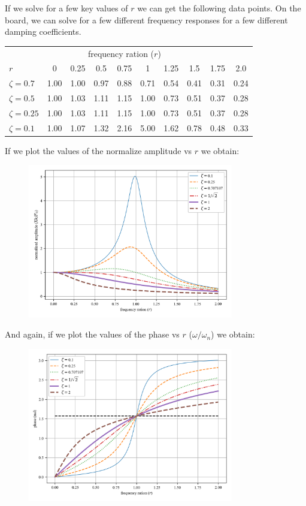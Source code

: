 \documentclass[12pt,letter]{article}
\numberwithin{ex}{section} %
\numberwithin{re}{section} %
\begin{document}
			If we solve for a few key values of $r$ we can get the following data points. On the board, we can solve for a few different frequency responses for a few different damping coefficients. 
			\begin{table}[H]
				\centering
				\begin{tabular}{@{}lccccccccc@{}}
				\toprule
				 & & \multicolumn{5}{c}{frequency ration ($r$)} \\ 
				$r$ & 0 & 0.25& 0.5& 0.75& 1& 1.25& 1.5& 1.75& 2.0 \\ \midrule
				$\zeta=0.7$	&	1.00&  1.00	&   0.97&	0.88&	0.71&	0.54&	0.41&	0.31 & 0.24\\
				$\zeta=0.5$	&	1.00&	1.03&	1.11&	1.15&	1.00&	0.73&	0.51&	0.37 & 0.28\\ 
				$\zeta=0.25$	&	1.00&	1.03&	1.11&	1.15&	1.00&	0.73&	0.51&	0.37 & 0.28 \\ 
				$\zeta=0.1$	&	1.00&	1.07&	1.32&	2.16&	5.00&	1.62&	0.78&	0.48 & 0.33 \\ \bottomrule
				\end{tabular}
			\end{table}
			If we plot the values of the normalize amplitude vs $r$ we obtain:
			\begin{figure}[H]
				\centering
				\includegraphics[width=0.8\textwidth]{../Figures/frequency_response_amplitude.png}
			\end{figure}			
			And again, if we plot the values of the phase vs $r$ ($\omega/\omega_n$) we obtain:
			\begin{figure}[H]
				\centering
				\includegraphics[width=0.8\textwidth]{../Figures/frequency_response_phase.png}
			\end{figure}				
\end{document}
